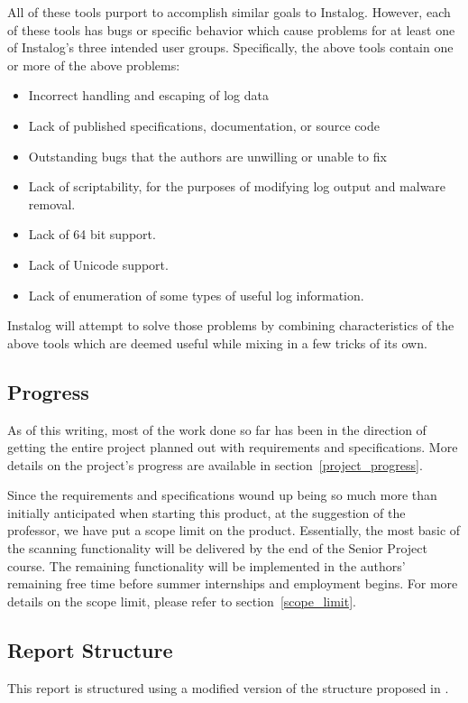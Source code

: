 \documentclass[letterpaper,12pt]{article}
\begin{document}
All of these tools purport to accomplish similar goals to Instalog. However,
each of these tools has bugs or specific behavior which cause problems for at
least one of Instalog's three intended user groups.  Specifically, the above
tools contain one or more of the above problems:

\begin{itemize}
    \item Incorrect handling and escaping of log data
    \item Lack of published specifications, documentation, or source code
    \item Outstanding bugs that the authors are unwilling or unable to fix
    \item Lack of scriptability, for the purposes of modifying log output and
    malware removal.
    \item Lack of 64 bit support.
    \item Lack of Unicode support.
    \item Lack of enumeration of some types of useful log information.
\end{itemize}

Instalog will attempt to solve those problems by combining characteristics of
the above tools which are deemed useful while mixing in a few tricks of its
own.

\subsection{Progress}
As of this writing, most of the work done so far has been in the direction of
getting the entire project planned out with requirements and specifications.
More details on the project's progress are available in
section~\ref{project_progress}.

Since the requirements and specifications wound up being so much more than
initially anticipated when starting this product, at the suggestion of the
professor, we have put a scope limit on the product.  Essentially, the most
basic of the scanning functionality will be delivered by the end of the Senior
Project course.  The remaining functionality will be implemented in the authors'
remaining free time before summer internships and employment begins.  For more
details on the scope limit, please refer to section~\ref{scope_limit}.

\subsection{Report Structure}
This report is structured using a modified version of the structure proposed in
\cite{ReportGuidelines}.
\end{document}
